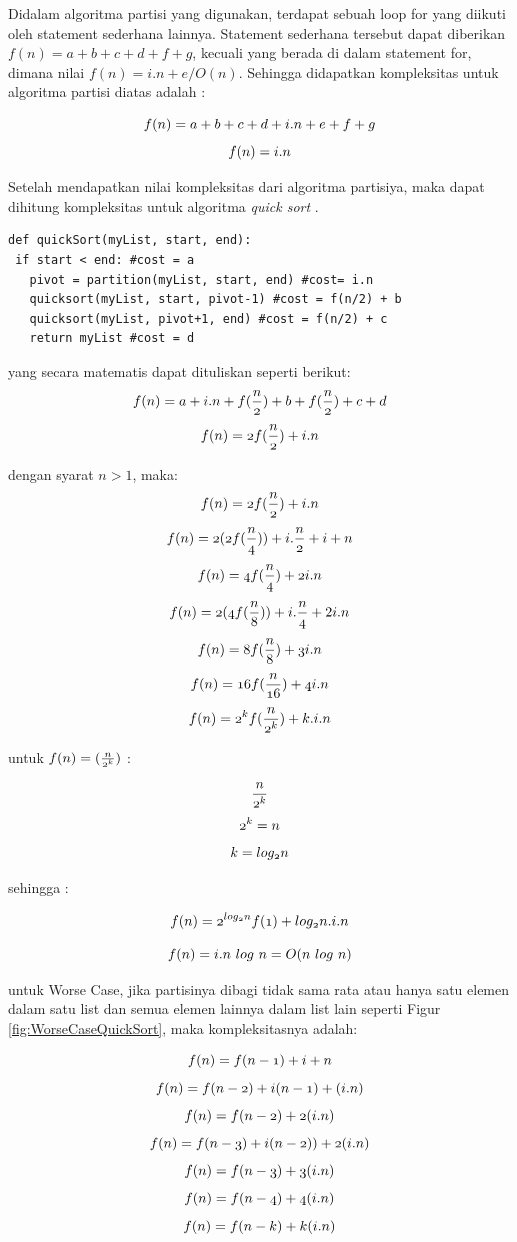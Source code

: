 \documentclass[12pt]{book}%
\begin{document}
Didalam algoritma partisi yang digunakan, terdapat sebuah loop for yang diikuti oleh statement sederhana lainnya. Statement sederhana tersebut dapat diberikan $f(n)= a+b+c+d+f+g$, kecuali yang berada di dalam statement for, dimana nilai $f(n) = i.n+e /O(n)$. Sehingga didapatkan kompleksitas untuk algoritma partisi diatas adalah :

$$ \mathnormal{f(n) = a+b+c+d+i.n+e+f+g} $$
$$ \mathnormal{f(n) = i.n} $$

Setelah mendapatkan nilai kompleksitas dari algoritma partisiya, maka dapat dihitung kompleksitas untuk algoritma \textit{quick sort} .

\lstset{language=Python}
\label{lst:QuickSort}
\begin{lstlisting}[frame=single]
def quickSort(myList, start, end):
 if start < end: #cost = a
   pivot = partition(myList, start, end) #cost= i.n
   quicksort(myList, start, pivot-1) #cost = f(n/2) + b
   quicksort(myList, pivot+1, end) #cost = f(n/2) + c
   return myList #cost = d
\end{lstlisting}

yang secara matematis dapat dituliskan seperti berikut:
$$	  \mathnormal{f(n) = a+i.n+f(\frac{n}{2})+b+f(\frac{n}{2})+c+d } $$
$$	  \mathnormal{f(n) = 2f(\frac{n}{2})+i.n } $$

dengan syarat $n > 1$, maka:
$$	  \mathnormal{f(n) = 2f(\frac{n}{2})+i.n } $$
$$	  \mathnormal{f(n) = 2(2f(\frac{n}{4}))+i.\frac{n}{2} } + i+n $$
$$	  \mathnormal{f(n) = 4f(\frac{n}{4})+2i.n } $$
$$	  \mathnormal{f(n) = 2(4f(\frac{n}{8}))+i.\frac{n}{4} }+2i.n $$
$$	  \mathnormal{f(n) = 8f(\frac{n}{8})+3i.n } $$
$$	  \mathnormal{f(n) = 16f(\frac{n}{16})+4i.n } $$
$$	  \mathnormal{f(n) = 2^{k}f(\frac{n}{2^{k}})+k.i.n } $$

untuk $ \mathnormal{f(n) = (\frac{n}{2^{k}})} $ :

$$ \mathnormal{\frac{n}{2^{k}}} $$
$$ \mathnormal{2^{k}=n} $$
$$ \mathnormal{k=log_{2}n} $$

sehingga :

$$	  \mathnormal{f(n) = 2^{log_{2}n}f(1)+log_{2}n.i.n } $$

$$	  \mathnormal{f(n) = i.n\ log\ n = O(n\ log\ n)} $$

untuk Worse Case, jika partisinya dibagi tidak sama rata atau hanya satu elemen dalam satu list dan semua elemen lainnya dalam list lain seperti Figur \ref{fig:WorseCaseQuickSort}, maka kompleksitasnya adalah:

$$	  \mathnormal{f(n) = f(n-1)+i+n} $$
$$	  \mathnormal{f(n) = f(n-2)+i(n-1)+(i.n)} $$
$$	  \mathnormal{f(n) = f(n-2)+2(i.n)} $$
$$	  \mathnormal{f(n) = f(n-3)+i(n-2))+2(i.n)} $$
$$	  \mathnormal{f(n) = f(n-3)+3(i.n)} $$
$$	  \mathnormal{f(n) = f(n-4)+4(i.n)} $$
$$	  \mathnormal{f(n) = f(n-k)+k(i.n)} $$
\end{document}
